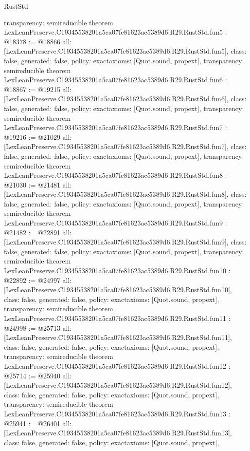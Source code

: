 \begin{lexlean}{RustStd}
\begin{coremodule}
{  transparency: semireducible
}
theorem LexLeanPreserve.C19345538201a5ca07fe81623ac5389d6.R29.RustStd.fun5 : @18378 := @18866 {
  all: [LexLeanPreserve.C19345538201a5ca07fe81623ac5389d6.R29.RustStd.fun5],
  class: false,
  generated: false,
  policy: exact{axioms: [Quot.sound, propext]},
  transparency: semireducible
}
theorem LexLeanPreserve.C19345538201a5ca07fe81623ac5389d6.R29.RustStd.fun6 : @18867 := @19215 {
  all: [LexLeanPreserve.C19345538201a5ca07fe81623ac5389d6.R29.RustStd.fun6],
  class: false,
  generated: false,
  policy: exact{axioms: [Quot.sound, propext]},
  transparency: semireducible
}
theorem LexLeanPreserve.C19345538201a5ca07fe81623ac5389d6.R29.RustStd.fun7 : @19216 := @21029 {
  all: [LexLeanPreserve.C19345538201a5ca07fe81623ac5389d6.R29.RustStd.fun7],
  class: false,
  generated: false,
  policy: exact{axioms: [Quot.sound, propext]},
  transparency: semireducible
}
theorem LexLeanPreserve.C19345538201a5ca07fe81623ac5389d6.R29.RustStd.fun8 : @21030 := @21481 {
  all: [LexLeanPreserve.C19345538201a5ca07fe81623ac5389d6.R29.RustStd.fun8],
  class: false,
  generated: false,
  policy: exact{axioms: [Quot.sound, propext]},
  transparency: semireducible
}
theorem LexLeanPreserve.C19345538201a5ca07fe81623ac5389d6.R29.RustStd.fun9 : @21482 := @22891 {
  all: [LexLeanPreserve.C19345538201a5ca07fe81623ac5389d6.R29.RustStd.fun9],
  class: false,
  generated: false,
  policy: exact{axioms: [Quot.sound, propext]},
  transparency: semireducible
}
theorem LexLeanPreserve.C19345538201a5ca07fe81623ac5389d6.R29.RustStd.fun10 : @22892 := @24997 {
  all: [LexLeanPreserve.C19345538201a5ca07fe81623ac5389d6.R29.RustStd.fun10],
  class: false,
  generated: false,
  policy: exact{axioms: [Quot.sound, propext]},
  transparency: semireducible
}
theorem LexLeanPreserve.C19345538201a5ca07fe81623ac5389d6.R29.RustStd.fun11 : @24998 := @25713 {
  all: [LexLeanPreserve.C19345538201a5ca07fe81623ac5389d6.R29.RustStd.fun11],
  class: false,
  generated: false,
  policy: exact{axioms: [Quot.sound, propext]},
  transparency: semireducible
}
theorem LexLeanPreserve.C19345538201a5ca07fe81623ac5389d6.R29.RustStd.fun12 : @25714 := @25940 {
  all: [LexLeanPreserve.C19345538201a5ca07fe81623ac5389d6.R29.RustStd.fun12],
  class: false,
  generated: false,
  policy: exact{axioms: [Quot.sound, propext]},
  transparency: semireducible
}
theorem LexLeanPreserve.C19345538201a5ca07fe81623ac5389d6.R29.RustStd.fun13 : @25941 := @26401 {
  all: [LexLeanPreserve.C19345538201a5ca07fe81623ac5389d6.R29.RustStd.fun13],
  class: false,
  generated: false,
  policy: exact{axioms: [Quot.sound, propext]},
}
\end{coremodule}
\end{lexlean}
